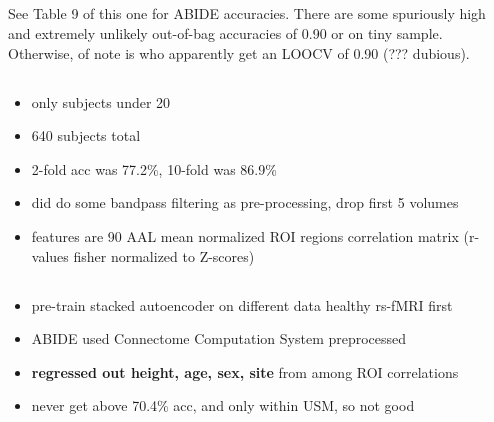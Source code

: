 \documentclass[10pt]{article}
\begin{document}
\subsection{\citet{sakaiMachineLearningStudies2019}}

See Table 9 of this one for ABIDE accuracies. There are some spuriously high and extremely unlikely
out-of-bag accuracies of 0.90 or on tiny sample. Otherwise, of note is
\citet{iidakaRestingStateFunctional2015} who apparently get an LOOCV of 0.90 (??? dubious).

\subsection{\citet{iidakaRestingStateFunctional2015}}

\begin{itemize}
  \item only subjects under 20
  \item 640 subjects total
  \item 2-fold acc was 77.2\%, 10-fold was 86.9\%
  \item did do some bandpass filtering as pre-processing, drop first 5 volumes
  \item features are 90 AAL mean normalized ROI regions correlation matrix (r-values fisher
  normalized to Z-scores)
\end{itemize}

\subsection{\citet{liNovelTransferLearning2018}}

\begin{itemize}
  \item pre-train stacked autoencoder on different data healthy rs-fMRI first
  \item ABIDE used Connectome Computation System preprocessed
  \item \textbf{regressed out height, age, sex, site} from among ROI correlations
  \item never get above 70.4\% acc, and only within USM, so not good
\end{itemize}

\subsection{\citet{kazeminejadTopologicalPropertiesRestingState2019}}
\end{document}
